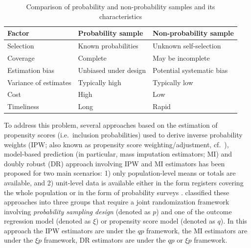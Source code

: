 \documentclass[
]{jss}
\begin{document}
\begin{table}[ht!]
    \centering
    \begin{tabular}{lll}
    \hline
    \textbf{Factor}   &  \textbf{Probability sample} & \textbf{Non-probability sample}\\
    \hline
    Selection & Known probabilities & Unknown self-selection \\
    Coverage & Complete & May be incomplete \\
    Estimation bias & Unbiased under design & Potential systematic bias \\
    Variance of estimates & Typically high & Typically low \\
    Cost & High & Low \\
    Timeliness & Long & Rapid \\
    \hline
    \end{tabular}
    \caption{Comparison of probability and non-probability samples and its characteristics}
    \label{tab-comparison-characteristics}
\end{table}

To address this problem, several approaches based on the estimation of
propensity scores (i.e.~inclusion probabilities) used to derive inverse
probability weights (IPW; also known as propensity score
weighting/adjustment, cf.~\citet{lee2006propensity, lee2009estimation}),
model-based prediction (in particular, mass imputation estimators; MI)
and doubly robust (DR) approach involving IPW and MI estimators has been
proposed for two main scenarios: 1) only population-level means or
totals are available, and 2) unit-level data is available either in the
form registers covering the whole population or in the form of
probability surveys \citep[cf.][]{elliott_inference_2017}.
\citet{wu2022statistical} classified these approaches into three groups
that require a joint randomization framework involving
\textit{probability sampling design} (denoted as \(p\)) and one of the
outcome regression model (denoted as \(\xi\)) or propensity score model
(denoted as \(q\)). In this approach the IPW estimators are under the
\(qp\) framework, the MI estimators are under the \(\xi p\) framework,
DR estimators are under the \(qp\) or \(\xi p\) framework.
\end{document}
